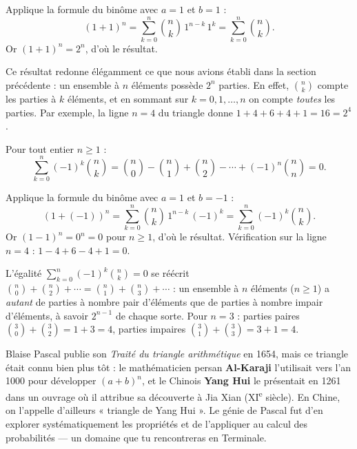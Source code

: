 \documentclass[11pt]{article}
\begin{document}
\begin{experience}[Démonstration]
Applique la formule du binôme avec $a = 1$ et $b = 1$ :
\[ (1+1)^n = \sum_{k=0}^{n} \binom{n}{k} \, 1^{n-k} \, 1^{k} = \sum_{k=0}^{n} \binom{n}{k}. \]
Or $(1+1)^n = 2^n$, d'où le résultat.
\end{experience}

\begin{aretenir}
Ce résultat redonne élégamment ce que nous avions établi dans la section précédente : un ensemble à $n$ éléments possède $2^n$ parties. En effet, $\binom{n}{k}$ compte les parties à $k$ éléments, et en sommant sur $k = 0, 1, \ldots, n$ on compte \emph{toutes} les parties. Par exemple, la ligne $n=4$ du triangle donne $1+4+6+4+1 = 16 = 2^4$.
\end{aretenir}

\begin{propriete}
Pour tout entier $n \geq 1$ :
\[ \sum_{k=0}^{n} (-1)^k \binom{n}{k} = \binom{n}{0} - \binom{n}{1} + \binom{n}{2} - \cdots + (-1)^n \binom{n}{n} = 0. \]
\end{propriete}

\begin{experience}[Démonstration]
Applique la formule du binôme avec $a = 1$ et $b = -1$ :
\[ (1 + (-1))^n = \sum_{k=0}^{n} \binom{n}{k} \, 1^{n-k} \, (-1)^k = \sum_{k=0}^{n} (-1)^k \binom{n}{k}. \]
Or $(1-1)^n = 0^n = 0$ pour $n \geq 1$, d'où le résultat. Vérification sur la ligne $n=4$ : $1 - 4 + 6 - 4 + 1 = 0$.
\end{experience}

\begin{exemplebox}
L'égalité $\sum_{k=0}^{n} (-1)^k \binom{n}{k} = 0$ se réécrit $\binom{n}{0} + \binom{n}{2} + \cdots = \binom{n}{1} + \binom{n}{3} + \cdots$ : un ensemble à $n$ éléments ($n \geq 1$) a \emph{autant} de parties à nombre pair d'éléments que de parties à nombre impair d'éléments, à savoir $2^{n-1}$ de chaque sorte. Pour $n=3$ : parties paires $\binom{3}{0}+\binom{3}{2} = 1+3 = 4$, parties impaires $\binom{3}{1}+\binom{3}{3} = 3+1 = 4$.
\end{exemplebox}

\begin{savaistu}
Blaise Pascal publie son \emph{Traité du triangle arithmétique} en 1654, mais ce triangle était connu bien plus tôt : le mathématicien persan \textbf{Al-Karaji} l'utilisait vers l'an 1000 pour développer $(a+b)^n$, et le Chinois \textbf{Yang Hui} le présentait en 1261 dans un ouvrage où il attribue sa découverte à Jia Xian (XI\textsuperscript{e} siècle). En Chine, on l'appelle d'ailleurs « triangle de Yang Hui ». Le génie de Pascal fut d'en explorer systématiquement les propriétés et de l'appliquer au calcul des probabilités — un domaine que tu rencontreras en Terminale.
\end{savaistu}
\end{document}
